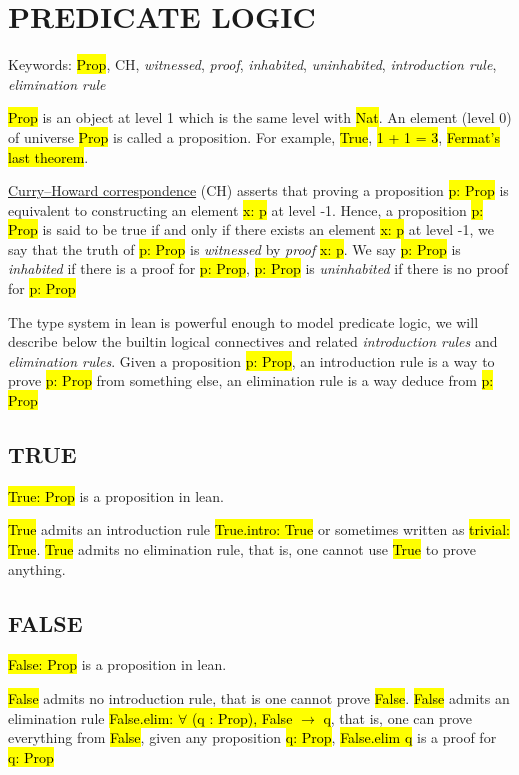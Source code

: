 \chapter{PREDICATE LOGIC}

Keywords: \hl{Prop}, CH, \textit{witnessed}, \textit{proof}, \textit{inhabited}, \textit{uninhabited}, \textit{introduction rule}, \textit{elimination rule}

\hl{Prop} is an object at level 1 which is the same level with \hl{Nat}. An element (level 0) of universe \hl{Prop} is called a proposition. For example, \hl{True}, \hl{1 + 1 = 3}, \hl{Fermat's last theorem}.

\href{https://en.wikipedia.org/wiki/Curry%E2%80%93Howard_correspondence}{Curry–Howard correspondence} (CH) asserts that proving a proposition \hl{p: Prop} is equivalent to constructing an element \hl{x: p} at level -1. Hence, a proposition \hl{p: Prop} is said to be true if and only if there exists an element  \hl{x: p} at level -1, we say that the truth of \hl{p: Prop} is \textit{witnessed} by \textit{proof} \hl{x: p}. We say \hl{p: Prop} is \textit{inhabited} if there is a proof for \hl{p: Prop}, \hl{p: Prop} is \textit{uninhabited} if there is no proof for \hl{p: Prop}

The type system in lean is powerful enough to model predicate logic, we will describe below the builtin logical connectives and related \textit{introduction rules} and \textit{elimination rules}. Given a proposition \hl{p: Prop}, an introduction rule is a way to prove \hl{p: Prop} from something else, an elimination rule is a way deduce from \hl{p: Prop}

\section{TRUE}

\hl{True: Prop} is a proposition in lean.

\hl{True} admits an introduction rule \hl{True.intro: True} or sometimes written as \hl{trivial: True}. \hl{True} admits no elimination rule, that is, one cannot use \hl{True} to prove anything.

\section{FALSE}

\hl{False: Prop} is a proposition in lean.

\hl{False} admits no introduction rule, that is one cannot prove \hl{False}. \hl{False} admits an elimination rule \hl{False.elim: $\forall$ (q : Prop), False $\to$ q}, that is, one can prove everything from \hl{False}, given any proposition \hl{q: Prop}, \hl{False.elim q} is a proof for \hl{q: Prop}

